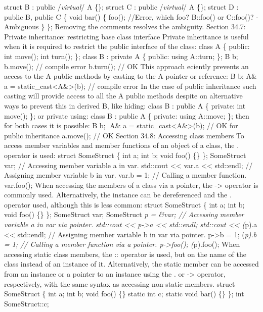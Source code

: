 struct B : public /\emph{virtual}/ A \{\}; struct C : public
/\emph{virtual}/ A \{\}; struct D : public B, public C \{ void bar() \{
foo(); //Error, which foo? B::foo() or C::foo()? - Ambiguous \} \};
Removing the comments resolves the ambiguity. Section 34.7: Private
inheritance: restricting base class interface Private inheritance is
useful when it is required to restrict the public interface of the
class: class A \{ public: int move(); int turn(); \}; class B : private
A \{ public: using A::turn; \}; B b; b.move(); // compile error
b.turn(); // OK This approach eciently prevents an access to the A
public methods by casting to the A pointer or reference: B b; A\& a =
static\_cast\textless A\&\textgreater(b); // compile error In the case
of public inheritance such casting will provide access to all the A
public methods despite on alternative ways to prevent this in derived B,
like hiding: class B : public A \{ private: int move(); \}; or private
using: class B : public A \{ private: using A::move; \}; then for both
cases it is possible: B b; A\& a =
static\_cast\textless A\&\textgreater(b); // OK for public inheritance
a.move(); // OK Section 34.8: Accessing class members To access member
variables and member functions of an object of a class, the . operator
is used: struct SomeStruct \{ int a; int b; void foo() \{\} \};
SomeStruct var; // Accessing member variable a in var. std::cout
\textless\textless{} var.a \textless\textless{} std::endl; // Assigning
member variable b in var. var.b = 1; // Calling a member function.
var.foo(); When accessing the members of a class via a pointer, the
-\textgreater{} operator is commonly used. Alternatively, the instance
can be dereferenced and the . operator used, although this is less
common: struct SomeStruct \{ int a; int b; void foo() \{\} \};
SomeStruct var; SomeStruct \emph{p = \&var; // Accessing member variable
a in var via pointer. std::cout \textless\textless{} p-\textgreater a
\textless\textless{} std::endl; std::cout \textless\textless{} (}p).a
\textless\textless{} std::endl; // Assigning member variable b in var
via pointer. p-\textgreater b = 1; (\emph{p).b = 1; // Calling a member
function via a pointer. p-\textgreater foo(); (}p).foo(); When accessing
static class members, the :: operator is used, but on the name of the
class instead of an instance of it. Alternatively, the static member can
be accessed from an instance or a pointer to an instance using the . or
-\textgreater{} operator, respectively, with the same syntax as
accessing non-static members. struct SomeStruct \{ int a; int b; void
foo() \{\} static int c; static void bar() \{\} \}; int SomeStruct::c;
